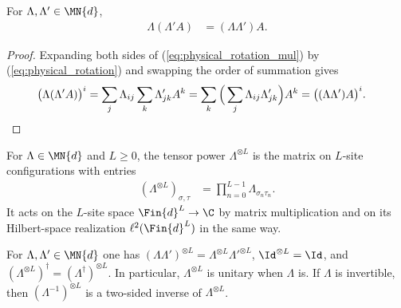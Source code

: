 \begin{lemma}\label{lem:physical_rotation_mul}
    \leanok
    For $\Lambda,\Lambda'\in\MN{d}$,
    \begin{align}
        \Lambda(\Lambda'A) & =(\Lambda\Lambda')A.
        \label{eq:physical_rotation_mul}
    \end{align}
\end{lemma}

\begin{proof}
    \leanok
    Expanding both sides of (\ref{eq:physical_rotation_mul}) by
    (\ref{eq:physical_rotation}) and swapping the order of summation gives
    \begin{align}
        \big(\Lambda(\Lambda'A)\big)^i
         & =\sum_{j}\Lambda_{ij}\sum_{k}\Lambda'_{jk}A^k
        =\sum_{k}\Big(\sum_{j}\Lambda_{ij}\Lambda'_{jk}\Big)A^k
        =\big((\Lambda\Lambda')A\big)^i.
        \notag
    \end{align}
\end{proof}

\begin{definition}\label{def:on_site_tensor_pow}
    \leanok
    For $\Lambda\in\MN{d}$ and $L\ge0$, the tensor power $\Lambda^{\otimes L}$ is the
    matrix on $L$-site configurations with entries
    \begin{align}
        (\Lambda^{\otimes L})_{\sigma,\tau} & =\prod_{n=0}^{L-1}\Lambda_{\sigma_n\tau_n}.
        \label{eq:on_site_tensor_pow}
    \end{align}
    It acts on the $L$-site space $\Fin{d}^{L}\to\C$ by matrix multiplication and on
    its Hilbert-space realization $\ell^2(\Fin{d}^{L})$ in the same way.
\end{definition}

\begin{lemma}\label{lem:on_site_tensor_pow_mul}
    \leanok
    For $\Lambda,\Lambda'\in\MN{d}$ one has
    $(\Lambda\Lambda')^{\otimes L}=\Lambda^{\otimes L}\Lambda'^{\otimes L}$,
    $\Id^{\otimes L}=\Id$, and
    $(\Lambda^{\otimes L})^\dagger=(\Lambda^\dagger)^{\otimes L}$.
    In particular, $\Lambda^{\otimes L}$ is unitary when $\Lambda$ is.
    If $\Lambda$ is invertible, then $(\Lambda^{-1})^{\otimes L}$ is a two-sided
    inverse of $\Lambda^{\otimes L}$.
\end{lemma}

